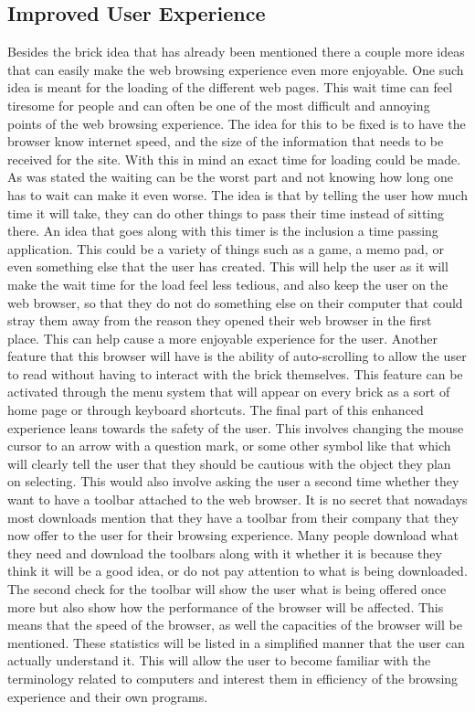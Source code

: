 \documentclass[11pt]{article}
\begin{document}
\subsection{Improved User Experience}
Besides the brick idea that has already been mentioned there a couple more ideas that can easily make the web browsing experience even more enjoyable. One such idea is meant for the loading of the different web pages. This wait time can feel tiresome for people and can often be one of the most difficult and annoying points of the web browsing experience. The idea for this to be fixed is to have the browser know internet speed, and the size of the information that needs to be received for the site. With this in mind an exact time for loading could be made. As was stated the waiting can be the worst part and not knowing how long one has to wait can make it even worse. The idea is that by telling the user how much time it will take, they can do other things to pass their time instead of sitting there. An idea that goes along with this timer is the inclusion a time passing application. This could be a variety of things such as a game, a memo pad, or even something else that the user has created. This will help the user as it will make the wait time for the load feel less tedious, and also keep the user on the web browser, so that they do not do something else on their computer that could stray them away from the reason they opened their web browser in the first place. This can help cause a more enjoyable experience for the user. Another feature that this browser will have is the ability of auto-scrolling to allow the user to read without having to interact with the brick themselves. This feature can be activated through the menu system that will appear on every brick as a sort of home page or through keyboard shortcuts. The final part of this enhanced experience leans towards the safety of the user. This involves changing the mouse cursor to an arrow with a question mark, or some other symbol like that which will clearly tell the user that they should be cautious with the object they plan on selecting. This would also involve asking the user a second time whether they want to have a toolbar attached to the web browser. It is no secret that nowadays most downloads mention that they have a toolbar from their company that they now offer to the user for their browsing experience. Many people download what they need and download the toolbars along with it whether it is because they think it will be a good idea, or do not pay attention to what is being downloaded. The second check for the toolbar will show the user what is being offered once more but also show how the performance of the browser will be affected. This means that the speed of the browser, as well the capacities of the browser will be mentioned. These statistics will be listed in a simplified manner that the user can actually understand it. This will allow the user to become familiar with the terminology related to computers and interest them in efficiency of the browsing experience and their own programs. 
\end{document}
